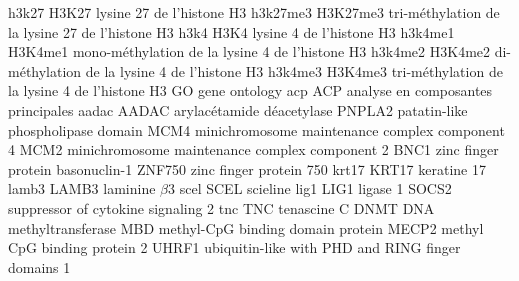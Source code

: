 %
\newacronym
	{h3k27}
	{H3K27}
	{lysine 27 de l'histone H3}
\newacronym
	{h3k27me3}
	{H3K27me3}
	{tri-méthylation de la lysine 27 de l'histone H3}
\newacronym
	{h3k4}
	{H3K4}
	{lysine 4 de l'histone H3}
\newacronym
	{h3k4me1}
	{H3K4me1}
	{mono-méthylation de la lysine 4 de l'histone H3}
\newacronym
	{h3k4me2}
	{H3K4me2}
	{di-méthylation de la lysine 4 de l'histone H3}
\newacronym
	{h3k4me3}
	{H3K4me3}
	{tri-méthylation de la lysine 4 de l'histone H3}
%
	{GO}
	{gene ontology}
\newacronym
	{acp}
	{ACP}
	{analyse en composantes principales}
%
\newacronym
	{aadac}
	{AADAC}
	{arylacétamide déacetylase}
	{PNPLA2}
	{patatin-like phospholipase domain}
	{MCM4}
	{minichromosome maintenance complex component 4}
	{MCM2}
	{minichromosome maintenance complex component 2}
	{BNC1}
	{zinc finger protein basonuclin-1}
	{ZNF750}
	{zinc finger protein 750}
\newacronym
	{krt17}
	{KRT17}
	{keratine 17}
\newacronym
	{lamb3}
	{LAMB3}
	{laminine $\beta$3}
\newacronym
	{scel}
	{SCEL}
	{scieline}
\newacronym
	{lig1}
	{LIG1}
	{ligase 1}
	{SOCS2}
	{suppressor of cytokine signaling 2}
\newacronym
	{tnc}
	{TNC}
	{tenascine C}
	{DNMT}
	{DNA methyltransferase}
	{MBD}
	{methyl-CpG binding domain protein}
	{MECP2}
	{methyl CpG binding protein 2}
	{UHRF1}
	{ubiquitin-like with PHD and RING finger domains 1}